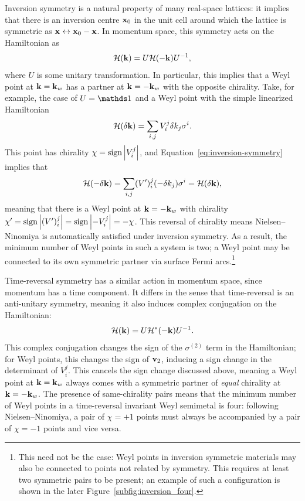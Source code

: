 Inversion symmetry is a natural property of many real-space lattices: it implies that there is an inversion centre $\vb{x}_0$ in the unit cell around which the lattice is symmetric as $\vb{x}\leftrightarrow\vb{x}_0-\vb{x}$. In momentum space, this symmetry acts on the Hamiltonian as
\begin{equation}\label{eq:inversion-symmetry}
	\mathcal{H}(\vb{k}) = U\mathcal{H}(-\vb{k})U^{-1},
\end{equation}
where $U$ is some unitary transformation. In particular, this implies that a Weyl point at $\vb{k}=\vb{k}_w$ has a partner at $\vb{k}=-\vb{k}_w$ with the opposite chirality. Take, for example, the case of $U=\Id$ and a Weyl point with the simple linearized Hamiltonian 
\begin{equation*}
	\mathcal{H}(\delta\vb{k}) = \sum_{i,j}V_i^j\delta k_j \sigma^i.
\end{equation*}
This point has chirality $\chi = \operatorname{sign}\abs{V_i^j}$, and Equation~\eqref{eq:inversion-symmetry} implies that
\begin{equation*}
	\mathcal{H}(-\delta\vb{k}) = \sum_{i,j}(V')_i^j(-\delta k_j)\sigma^i = \mathcal{H}(\delta\vb{k}),
\end{equation*}
meaning that there is a Weyl point at $\vb{k}=-\vb{k}_w$ with chirality $\chi' = \operatorname{sign}\abs{(V')_i^j} = \operatorname{sign}\abs{-V_i^j} = -\chi$. This reversal of chirality means Nielsen--Ninomiya is automatically satisfied under inversion symmetry. As a result, the minimum number of Weyl points in such a system is two; a Weyl point may be connected to its own symmetric partner via surface Fermi arcs.\footnote{
	This need not be the case: Weyl points in inversion symmetric materials may also be connected to points not related by symmetry. This requires at least two symmetric pairs to be present; an example of such a configuration is shown in the later Figure~\ref{subfig:inversion_four}.}

Time-reversal symmetry has a similar action in momentum space, since momentum has a time component. It differs in the sense that time-reversal is an anti-unitary symmetry, meaning it also induces complex conjugation on the Hamiltonian:
\begin{equation*}
	\mathcal{H}(\vb{k}) = U\mathcal{H}^*(-\vb{k})U^{-1}.
\end{equation*}
This complex conjugation changes the sign of the $\sigma^{(2)}$ term in the Hamiltonian; for Weyl points, this changes the sign of $\vb{v}_2$, inducing a sign change in the determinant of $V_i^j$. This cancels the sign change discussed above, meaning a Weyl point at $\vb{k}=\vb{k}_w$ always comes with a symmetric partner of \emph{equal} chirality at $\vb{k}=-\vb{k}_w$. The presence of same-chirality pairs means that the minimum number of Weyl points in a time-reversal invariant Weyl semimetal is four: following Nielsen--Ninomiya, a pair of $\chi = +1$ points must always be accompanied by a pair of $\chi=-1$ points and vice versa.

